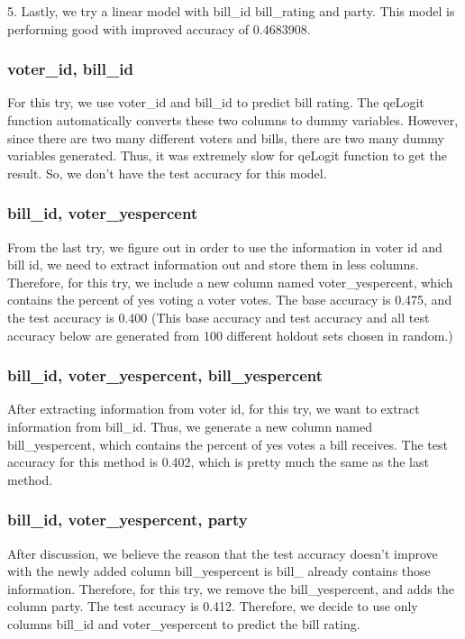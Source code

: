 \documentclass{article}
\begin{document}
5. Lastly, we try a linear model with bill\_id bill\_rating and party. This model is performing good with improved accuracy of 0.4683908.


\subsubsection{voter\_id, bill\_id}
For this try, we use voter\_id and bill\_id to predict bill rating. The qeLogit function automatically converts these two columns to dummy variables. However, since there are two many different voters and bills, there are two many dummy variables generated. Thus, it was extremely slow for qeLogit function to get the result. So, we don't have the test accuracy for this model.
\subsubsection{bill\_id, voter\_yespercent}
From the last try, we figure out in order to use the information in voter id and bill id, we need to extract information out and store them in less columns. Therefore, for this try, we include a new column named voter\_yespercent, which contains the percent of yes voting a voter votes. The base accuracy is 0.475, and the test accuracy is 0.400 (This base accuracy and test accuracy and all test accuracy below are generated from 100 different holdout sets chosen in random.)
\subsubsection{bill\_id, voter\_yespercent, bill\_yespercent}
After extracting information from voter id, for this try, we want to extract information from bill\_id. Thus, we generate a new column named bill\_yespercent, which contains the percent of yes votes a bill receives. The test accuracy for this method is 0.402, which is pretty much the same as the last method.
\subsubsection{bill\_id, voter\_yespercent, party}
After discussion, we believe the reason that the test accuracy doesn't improve with the newly added column bill\_yespercent is bill\_ already contains those information. Therefore, for this try, we remove the bill\_yespercent, and adds the column party. The test accuracy is 0.412. Therefore, we decide to use only columns bill\_id and voter\_yespercent to predict the bill rating.
\end{document}
